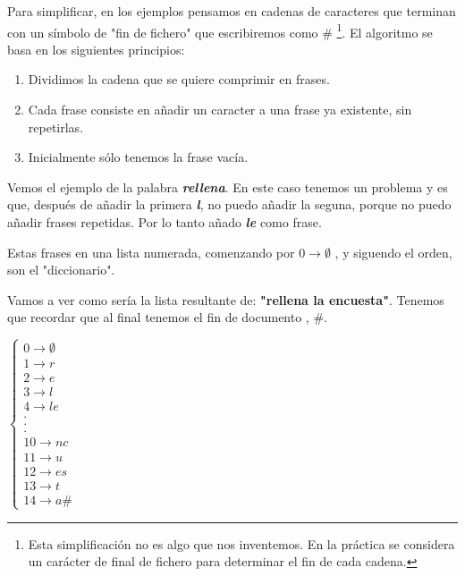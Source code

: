 	Para simplificar, en los ejemplos pensamos en cadenas de caracteres que terminan con un símbolo de "fin de fichero" que escribiremos como \# \footnote{Esta simplificación no es algo que nos inventemos. En la práctica se considera un carácter de final de fichero para determinar el fin de cada cadena.}. El algoritmo se basa en los siguientes principios:

	\begin{enumerate}
	\item Dividimos la cadena que se quiere comprimir en frases.

	\item Cada frase consiste en añadir un caracter a una frase ya existente, sin repetirlas.

	\item Inicialmente sólo tenemos la frase vacía.
	\end{enumerate}

	Vemos el ejemplo de la palabra \textbf{\textit{rellena}}. En este caso tenemos un problema y es que, después de añadir la primera \textbf{\textit{l}}, no puedo añadir la seguna, porque no puedo añadir frases repetidas. Por lo tanto añado \textbf{\textit{le}} como frase.

	Estas frases en una lista numerada, comenzando por $0 \rightarrow \emptyset$ , y siguendo el orden, son el "diccionario".

	\begin{example}
		Vamos a ver como sería la lista resultante de: \textbf{"rellena la encuesta"}. Tenemos que recordar que al final tenemos el fin de documento , \#.


		$\begin{cases}
			0 \rightarrow \emptyset\\
			1\rightarrow r\\
			2 \rightarrow e\\
			3\rightarrow l\\
			4 \rightarrow le\\
			.\\
			.\\
			.\\
			10 \rightarrow nc\\
			11\rightarrow u\\
			12 \rightarrow es\\
			13 \rightarrow t\\
			14 \rightarrow a\#
		\end{cases}$

	\end{example}

